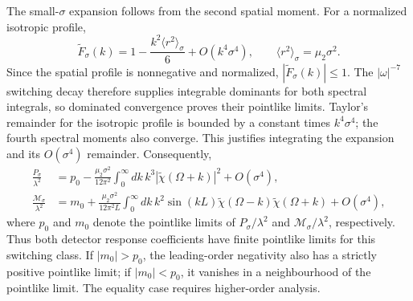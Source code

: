 \documentclass[pdflatex,sn-mathphys-num]{sn-jnl}
\begin{document}
The small-$\sigma$ expansion follows from the second spatial moment. For a normalized isotropic profile,
\begin{equation}
\widetilde F_\sigma(k)
=1-\frac{k^2\langle r^2\rangle_\sigma}{6}
+O(k^4\sigma^4),\qquad
\langle r^2\rangle_\sigma=\mu_2\sigma^2.
\label{eq:profile-moment-expansion}
\end{equation}
Since the spatial profile is nonnegative and normalized, $|\widetilde F_\sigma(k)|\leq1$. The $|\omega|^{-7}$ switching decay therefore supplies integrable dominants for both spectral integrals, so dominated convergence proves their pointlike limits. Taylor's remainder for the isotropic profile is bounded by a constant times $k^4\sigma^4$; the fourth spectral moments also converge. This justifies integrating the expansion and its $O(\sigma^4)$ remainder. Consequently,
\begin{align}
\frac{P_\sigma}{\lambda^2}
&=p_0-\frac{\mu_2\sigma^2}{12\pi^2}
\int_0^\infty dk\,k^3|\widetilde\chi(\Omega+k)|^2
+O(\sigma^4),
\label{eq:pointlike-P-expansion}\\
\frac{\mathcal M_\sigma}{\lambda^2}
&=m_0+\frac{\mu_2\sigma^2}{12\pi^2L}
\int_0^\infty dk\,k^2\sin(kL)
\widetilde\chi(\Omega-k)\widetilde\chi(\Omega+k)
+O(\sigma^4),
\label{eq:pointlike-M-expansion}
\end{align}
where $p_0$ and $m_0$ denote the pointlike limits of $P_\sigma/\lambda^2$ and $\mathcal M_\sigma/\lambda^2$, respectively. Thus both detector response coefficients have finite pointlike limits for this switching class. If $|m_0|>p_0$, the leading-order negativity also has a strictly positive pointlike limit; if $|m_0|<p_0$, it vanishes in a neighbourhood of the pointlike limit. The equality case requires higher-order analysis.
\end{document}

